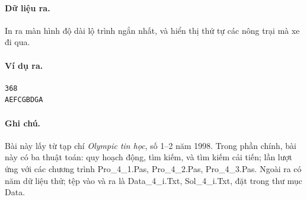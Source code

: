 \documentclass[11pt]{article}
\begin{document}
\paragraph{Dữ liệu ra.}
In ra màn hình độ dài lộ trình ngắn nhất, và hiển thị thứ tự các nông trại mà
xe đi qua.

\paragraph{Ví dụ ra.}
\begin{verbatim}
368
AEFCGBDGA
\end{verbatim}

\paragraph{Ghi chú.}
Bài này lấy từ tạp chí \textit{Olympic tin học}, số 1--2 năm 1998. Trong phần
chính, bài này có ba thuật toán: quy hoạch động, tìm kiếm, và tìm kiếm cải
tiến; lần lượt ứng với các chương trình Pro\_4\_1.Pas, Pro\_4\_2.Pas,
Pro\_4\_3.Pas. Ngoài ra có năm dữ liệu thử; tệp vào và ra là
Data\_4\_i.Txt, Sol\_4\_i.Txt, đặt trong thư mục Data.
\end{document}

